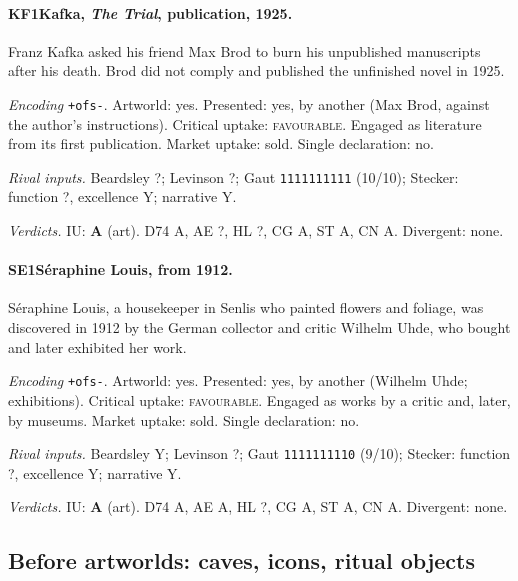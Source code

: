 \paragraph{KF1\enspace Kafka, \emph{The Trial}, publication, 1925.}
Franz Kafka asked his friend Max Brod to burn his unpublished manuscripts after his death. Brod did not comply and published the unfinished novel in 1925.\par
\noindent\textit{Encoding} \texttt{+ofs-}. Artworld: yes. Presented: yes, by another (Max Brod, against the author's instructions). Critical uptake: \textsc{favourable}. Engaged as literature from its first publication. Market uptake: sold. Single declaration: no.\par
\noindent\textit{Rival inputs.} Beardsley ?; Levinson ?; Gaut \texttt{1111111111} (10/10); Stecker: function ?, excellence Y; narrative Y.\par
\noindent\textit{Verdicts.} IU: \textbf{A} (art). D74 A, AE ?, HL ?, CG A, ST A, CN A. Divergent: none.\par

\paragraph{SE1\enspace S\'eraphine Louis, from 1912.}
S\'eraphine Louis, a housekeeper in Senlis who painted flowers and foliage, was discovered in 1912 by the German collector and critic Wilhelm Uhde, who bought and later exhibited her work.\par
\noindent\textit{Encoding} \texttt{+ofs-}. Artworld: yes. Presented: yes, by another (Wilhelm Uhde; exhibitions). Critical uptake: \textsc{favourable}. Engaged as works by a critic and, later, by museums. Market uptake: sold. Single declaration: no.\par
\noindent\textit{Rival inputs.} Beardsley Y; Levinson ?; Gaut \texttt{1111111110} (9/10); Stecker: function ?, excellence Y; narrative Y.\par
\noindent\textit{Verdicts.} IU: \textbf{A} (art). D74 A, AE A, HL ?, CG A, ST A, CN A. Divergent: none.\par

\subsection{Before artworlds: caves, icons, ritual objects}

